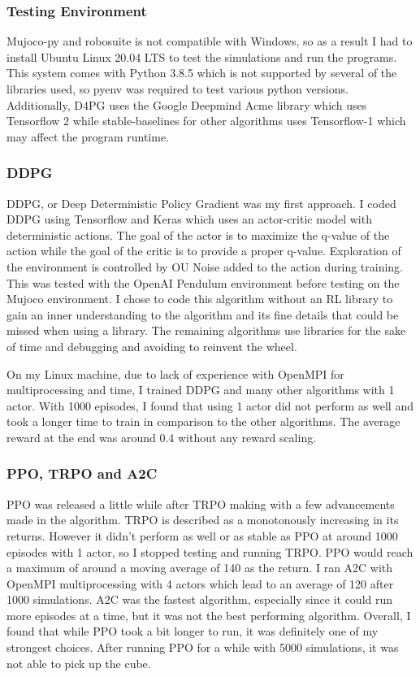 \documentclass[8pt]{extarticle}
\begin{document}
\begin{adjmulticols}{2}{-1in}{-1in}
\subsubsection {Testing Environment}
Mujoco-py and robosuite is not compatible with Windows, so as a result I had to install Ubuntu Linux 20.04 LTS to test the simulations and run the programs. This system comes with Python 3.8.5 which is not supported by several of the libraries used, so pyenv was required to test various python versions. Additionally, D4PG uses the Google Deepmind Acme library which uses Tensorflow 2 while stable-baselines for other algorithms uses Tensorflow-1 which may affect the program runtime.

\subsubsection {DDPG}
DDPG, or Deep Deterministic Policy Gradient was my first approach. I coded DDPG using Tensorflow and Keras which uses an actor-critic model with deterministic actions. The goal of the actor is to maximize the q-value of the action while the goal of the critic is to provide a proper q-value. Exploration of the environment is controlled by OU Noise added to the action during training. This was tested with the OpenAI Pendulum environment before testing on the Mujoco environment. I chose to code this algorithm without an RL library to gain an inner understanding to the algorithm and its fine details that could be missed when using a library. The remaining algorithms use libraries for the sake of time and debugging and avoiding to reinvent the wheel.

On my Linux machine, due to lack of experience with OpenMPI for multiprocessing and time, I trained DDPG and many other algorithms with 1 actor. With 1000 episodes, I found that using 1 actor did not perform as well and took a longer time to train in comparison to the other algorithms. The average reward at the end was around 0.4 without any reward scaling.


\subsubsection {PPO, TRPO and A2C}
PPO was released a little while after TRPO making with a few advancements made in the algorithm. TRPO is described as a monotonously increasing in its returns.  However it didn't perform as well or as stable as PPO at around 1000 episodes with 1 actor, so I stopped testing and running TRPO. PPO would reach a maximum of around a moving average of 140 as the return. I ran A2C with OpenMPI multiprocessing with 4 actors which lead to an average of 120 after 1000 simulations. A2C was the fastest algorithm, especially since it could run more episodes at a time, but it was not the best performing algorithm. Overall, I found that while PPO took a bit longer to run, it was definitely one of my strongest choices. After running PPO for a while with 5000 simulations, it was not able to pick up the cube.


\end{adjmulticols}
\end{document}
